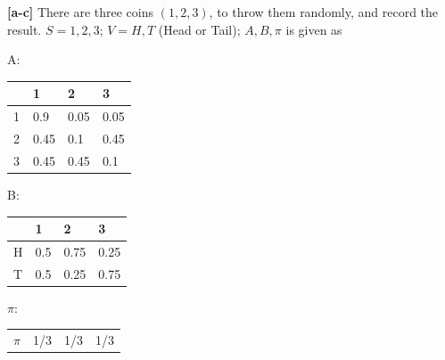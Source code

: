 \documentclass[twoside,11pt]{article}\usepackage{amsmath,amsfonts,amsthm,fullpage}
\begin{document}
\textbf{[a-c]} There are three coins $(1,2,3)$, to throw them
randomly, and record the result. $S = {1,2,3}$; $V = {H,T}$ (Head or
Tail); $A, B, \pi$ is given as

\begin{table}[!htb]
    \begin{minipage}{.5\linewidth}
      \centering
A:
    \begin{tabular}{l|l|l|l}
    ~ & 1    & 2    & 3    \\\hline
    1 & 0.9  & 0.05 & 0.05 \\
    2 & 0.45 & 0.1  & 0.45 \\
    3 & 0.45 & 0.45 & 0.1  \\
    \end{tabular}

    \end{minipage}%
    \begin{minipage}{.5\linewidth}
      \centering

B:
    \begin{tabular}{l|l|l|l}
    ~ & 1   & 2    & 3    \\\hline
    H & 0.5 & 0.75 & 0.25 \\
    T & 0.5 & 0.25 & 0.75 \\
    \end{tabular}

    \end{minipage}

    \begin{minipage}{.5\linewidth}
      \centering
$\pi:$
    \begin{tabular}{llll}
    $\pi$ & 1/3 & 1/3 & 1/3 \\
    \end{tabular}
  \end{minipage}

\end{table}
\end{document}
